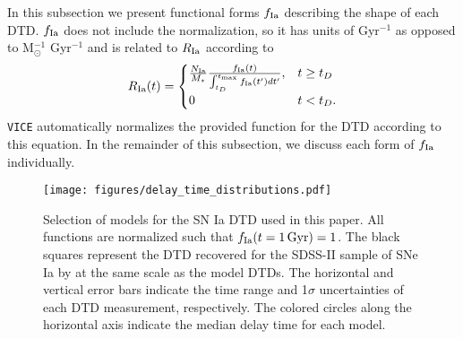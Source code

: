 \documentclass[twocolumn,twocolappendix,linenumbers]{aastex631}
\newcommand{\vice}{{\tt VICE}\xspace}
\begin{document}
In this subsection we present functional forms $f_{\rm Ia}$ describing the shape of each DTD. $f_{\rm Ia}$ does not include the normalization, so it has units of Gyr$^{-1}$ as opposed to M$_\odot^{-1}$ Gyr$^{-1}$ and is related to $R_{\rm Ia}$ according to
\begin{equation}
    R_{\rm Ia}(t) = 
    \begin{cases}
        \frac{N_{\rm Ia}}{M_\star}
        \frac{f_{\rm Ia}(t)}{\int_{t_D}^{t_{\rm max}} f_{\rm Ia}(t') dt'}, & t \ge t_D \\
        0 & t < t_D.
    \end{cases}
    \label{eq:dtd-function}
\end{equation}
\vice automatically normalizes the provided function for the DTD according to this equation.
In the remainder of this subsection, we discuss each form of $f_{\rm Ia}$ individually.

\begin{figure}
    \centering
    \texttt{[image: figures/delay\_time\_distributions.pdf]}
    \caption{Selection of models for the SN Ia DTD used in this paper. All functions are normalized such that $f_{\rm Ia}(t=1\,{\rm Gyr})=1$. The black squares represent the DTD recovered for the SDSS-II sample of SNe Ia by \citet{Maoz2012-SloanIIDTD} at the same scale as the model DTDs. The horizontal and vertical error bars indicate the time range and 1$\sigma$ uncertainties of each DTD measurement, respectively. The colored circles along the horizontal axis indicate the median delay time for each model.}
    \label{fig:dtds}
\end{figure}
\end{document}
